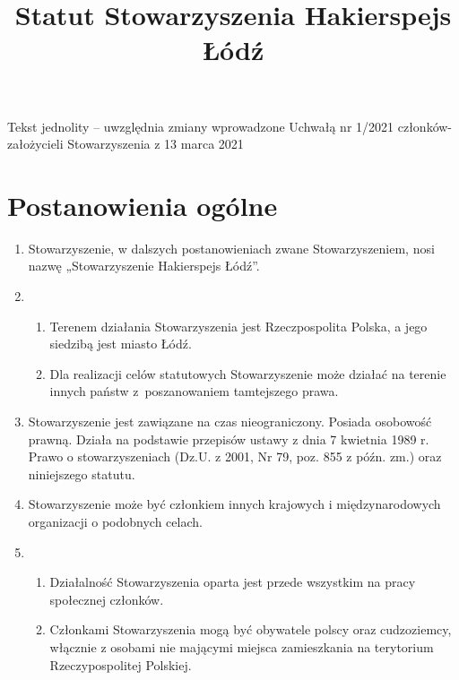 \documentclass[chapterprefix,notitlepage]{article}
\begin{document}
\title{Statut Stowarzyszenia Hakierspejs Łódź}
\author{}
\date{}
\maketitle

\begin{center}
\large Tekst jednolity – uwzględnia zmiany wprowadzone Uchwałą nr 1/2021 członków-założycieli Stowarzyszenia z 13 marca 2021
\end{center}

\section{Postanowienia ogólne}

\begin{enumerate}

	\item Stowarzyszenie, w dalszych postanowieniach zwane Stowarzyszeniem, nosi nazwę „Stowarzyszenie Hakierspejs Łódź”.
	
	\item \begin{enumerate}
		\item Terenem działania Stowarzyszenia jest Rzeczpospolita Polska, a jego siedzibą jest miasto Łódź.
		\item Dla realizacji celów statutowych Stowarzyszenie może działać na terenie innych państw z~poszanowaniem tamtejszego prawa.
	\end{enumerate}
	
	\item Stowarzyszenie jest zawiązane na czas nieograniczony. Posiada osobowość prawną. Działa na podstawie przepisów ustawy z dnia 7 kwietnia 1989 r. Prawo o stowarzyszeniach (Dz.U. z 2001, Nr 79, poz. 855 z późn. zm.) oraz niniejszego statutu.
	
	\item Stowarzyszenie może być członkiem innych krajowych i międzynarodowych organizacji o podobnych celach.
	
	\item \begin{enumerate}
		\item Działalność Stowarzyszenia oparta jest przede wszystkim na pracy społecznej członków.
		\item Członkami Stowarzyszenia mogą być obywatele polscy oraz cudzoziemcy, włącznie z osobami nie mającymi miejsca zamieszkania na terytorium Rzeczypospolitej Polskiej.
	\end{enumerate}
	

\end{enumerate}
\end{document}

